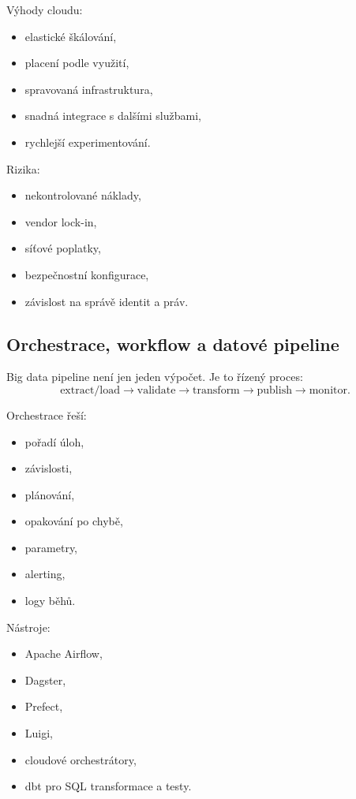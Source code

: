 Výhody cloudu:
\begin{itemize}
    \item elastické škálování,
    \item placení podle využití,
    \item spravovaná infrastruktura,
    \item snadná integrace s dalšími službami,
    \item rychlejší experimentování.
\end{itemize}

Rizika:
\begin{itemize}
    \item nekontrolované náklady,
    \item vendor lock-in,
    \item síťové poplatky,
    \item bezpečnostní konfigurace,
    \item závislost na správě identit a práv.
\end{itemize}

\subsection{Orchestrace, workflow a datové pipeline}

Big data pipeline není jen jeden výpočet. Je to řízený proces:
\[
\text{extract/load}
\rightarrow
\text{validate}
\rightarrow
\text{transform}
\rightarrow
\text{publish}
\rightarrow
\text{monitor}.
\]

Orchestrace řeší:
\begin{itemize}
    \item pořadí úloh,
    \item závislosti,
    \item plánování,
    \item opakování po chybě,
    \item parametry,
    \item alerting,
    \item logy běhů.
\end{itemize}

Nástroje:
\begin{itemize}
    \item Apache Airflow,
    \item Dagster,
    \item Prefect,
    \item Luigi,
    \item cloudové orchestrátory,
    \item dbt pro SQL transformace a testy.
\end{itemize}

